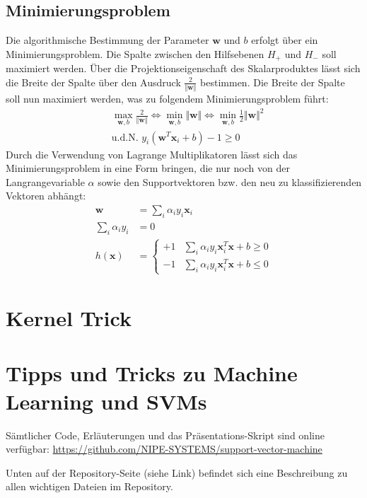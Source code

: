 \documentclass[10pt,a4paper]{scrartcl}
\begin{document}
            \subsection{Minimierungsproblem}
                Die algorithmische Bestimmung der Parameter $\boldsymbol{w}$ und $b$ erfolgt über ein Minimierungsproblem. Die Spalte zwischen den Hilfsebenen $H_+$ und $H_-$ soll maximiert werden. Über die Projektionseigenschaft des Skalarproduktes lässt sich die Breite der Spalte über den Ausdruck $\frac{2}{\Vert \boldsymbol{w} \Vert}$ bestimmen. Die Breite der Spalte soll nun maximiert werden, was zu folgendem Minimierungsproblem führt:
                \begin{align*}
                    & \max_{\boldsymbol{w}, b} \frac{2}{\Vert \boldsymbol{w} \Vert} \Leftrightarrow \min_{\boldsymbol{w}, b} \Vert \boldsymbol{w} \Vert \Leftrightarrow \min_{\boldsymbol{w}, b} \frac{1}{2} \Vert \boldsymbol{w} \Vert^2 \\
                    & \text{u.d.N. } y_i ( \boldsymbol{w}^T \boldsymbol{x}_i + b ) - 1 \geq 0
                \end{align*}
                Durch die Verwendung von Lagrange Multiplikatoren lässt sich das Minimierungsproblem in eine Form bringen, die nur noch von der Langrangevariable $\alpha$ sowie den Supportvektoren bzw. den neu zu klassifizierenden Vektoren abhängt:
                \begin{align*}
                    \boldsymbol{w} &= \sum_i \alpha_i y_i \boldsymbol{x}_i \\
                    \sum_i \alpha_i y_i &= 0 \\
                    h(\boldsymbol{x}) &= \begin{cases}
                        +1 & \sum_i \alpha_i y_i \boldsymbol{x}_i^T \boldsymbol{x} + b \geq 0 \\
                        -1 & \sum_i \alpha_i y_i \boldsymbol{x}_i^T \boldsymbol{x} + b \leq 0
                    \end{cases}
                \end{align*}
        \section{Kernel Trick}

        \section{Tipps und Tricks zu Machine Learning und SVMs}
            Sämtlicher Code, Erläuterungen und das Präsentations-Skript sind online verfügbar: \url{https://github.com/NIPE-SYSTEMS/support-vector-machine}
            
            Unten auf der Repository-Seite (siehe Link) befindet sich eine Beschreibung zu allen wichtigen Dateien im Repository.


\end{document}
